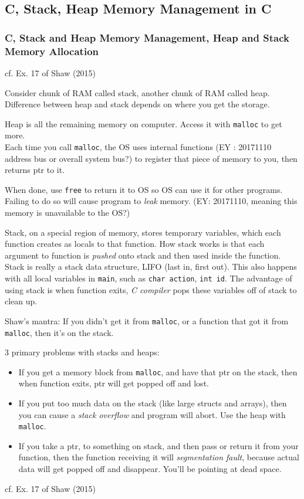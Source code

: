 \documentclass[10pt]{amsart}
\begin{document}
\begin{multicols*}{2}
\part{C, Stack, Heap Memory Management in C}

\section{C, Stack and Heap Memory Management, Heap and Stack Memory Allocation}  

cf. Ex. 17 of Shaw (2015) \cite{Shaw2015}

Consider chunk of RAM called stack, another chunk of RAM called heap.  Difference between heap and stack depends on where you get the storage.  

Heap is all the remaining memory on computer.  Access it with \verb|malloc| to get more.  \\
Each time you call \verb|malloc|, the OS uses internal functions (EY : 20171110 address bus or overall system bus?) to register that piece of memory to you, then returns ptr to it.  

When done, use \verb|free| to return it to OS so OS can use it for other programs.  Failing to do so will cause program to \emph{leak} memory.  (EY: 20171110, meaning this memory is unavailable to the OS?)

Stack, on a special region of memory, stores temporary variables, which each function creates as locals to that function.  How stack works is that each argument to function is \emph{pushed} onto stack and then used inside the function.  Stack is really a stack data structure, LIFO (last in, first out).  This also happens with all local variables in \verb|main|, such as \verb|char action|, \verb|int id|.  The advantage of using stack is when function exits, \emph{C compiler} pops these variables off of stack to clean up.  

Shaw's mantra: If you didn't get it from \verb|malloc|, or a function that got it from \verb|malloc|, then it's on the stack.  

3 primary problems with stacks and heaps: 
\begin{itemize}
	\item If you get a memory block from \verb|malloc|, and have that ptr on the stack, then when function exits, ptr will get popped off and lost.  
	\item If you put too much data on the stack (like large structs and arrays), then you can cause a \emph{stack overflow} and program will abort.  Use the heap with \verb|malloc|.  
	\item If you take a ptr, to something on stack, and then pass or return it from your function, then the function receiving it will \emph{segmentation fault}, because actual data will get popped off and disappear.  You'll be pointing at dead space.  
\end{itemize}
cf. Ex. 17 of Shaw (2015) \cite{Shaw2015}


\end{multicols*}
\end{document}
